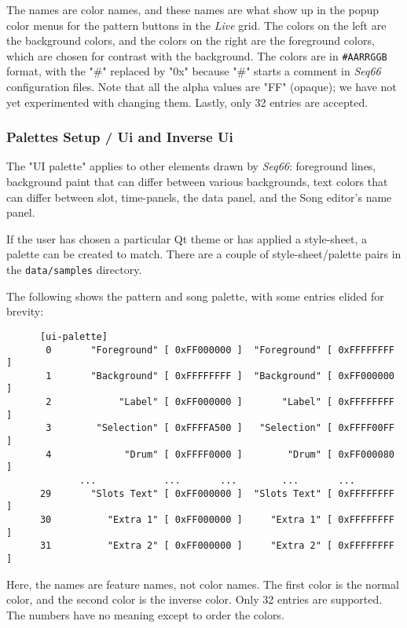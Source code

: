    The names are color names, and these names are what show up in the popup
   color menus for the pattern buttons in the \textsl{Live} grid.
   The colors on the left are the background colors, and the colors on the
   right are the foreground colors, which are chosen for contrast with the
   background.  The colors are in \texttt{\#AARRGGB} format, with the "\#"
   replaced by "0x" because "\#" starts a comment in \textsl{Seq66}
   configuration files.  Note that all the alpha values are "FF" (opaque); we
   have not yet experimented with changing them.
   Lastly, only 32 entries are accepted.

\subsubsection{Palettes Setup / Ui and Inverse Ui}
\label{subsubsec:palettes_setup_ui}

   The "UI palette" applies to other elements drawn by \textsl{Seq66}:
   foreground lines, background paint that can differ between various
   backgrounds, text colors that can differ between slot, time-panels,
   the data panel, and the Song editor's name panel.
   
   If the user has chosen a particular Qt theme or has applied a
   style-sheet, a palette can be created to match.
   There are a couple of style-sheet/palette pairs in the
   \texttt{data/samples} directory.

   The following shows the pattern and song palette,
   with some entries elided for brevity:

   \begin{verbatim}
      [ui-palette]
       0       "Foreground" [ 0xFF000000 ]  "Foreground" [ 0xFFFFFFFF ]
       1       "Background" [ 0xFFFFFFFF ]  "Background" [ 0xFF000000 ]
       2            "Label" [ 0xFF000000 ]       "Label" [ 0xFFFFFFFF ]
       3        "Selection" [ 0xFFFFA500 ]   "Selection" [ 0xFFFF00FF ]
       4             "Drum" [ 0xFFFF0000 ]        "Drum" [ 0xFF000080 ]
             ...            ...       ...        ...       ...
      29       "Slots Text" [ 0xFF000000 ]  "Slots Text" [ 0xFFFFFFFF ]
      30          "Extra 1" [ 0xFF000000 ]     "Extra 1" [ 0xFFFFFFFF ]
      31          "Extra 2" [ 0xFF000000 ]     "Extra 2" [ 0xFFFFFFFF ]
   \end{verbatim}

   Here, the names are feature names, not color names.  The first color is the
   normal color, and the second color is the inverse color.  Only 32 entries
   are supported. The numbers have no meaning except to order the colors.

